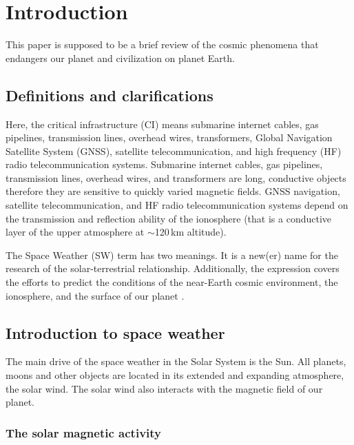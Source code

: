 \documentclass[sn-aps]{sn-jnl}%
\begin{document}
\section{Introduction}
\label{sec:intro}

This paper is supposed to be a brief review of the cosmic phenomena that endangers our planet and civilization on planet Earth. 

\subsection{Definitions and clarifications}
\label{sec:def}

Here, the critical infrastructure (CI) means submarine internet cables, gas pipelines, transmission lines, overhead wires, transformers, Global Navigation Satellite System (GNSS), satellite telecommunication, and high frequency (HF) radio telecommunication systems. Submarine internet cables, gas pipelines, transmission lines, overhead wires, and transformers are long, conductive objects therefore they are sensitive to quickly varied magnetic fields. GNSS navigation, satellite telecommunication, and HF radio telecommunication systems depend on the transmission and reflection ability of the ionosphere (that is a conductive layer of the upper atmosphere at $\sim$120\,km altitude).

The Space Weather (SW) term has two meanings. It is a new(er) name for the research of the solar-terrestrial relationship. Additionally, the expression covers the efforts to predict the conditions of the near-Earth cosmic environment, the ionosphere, and the surface of our planet \cite{scherer05:_space_weath}. 


\subsection{Introduction to space weather}
\label{sec:swintro}

The main drive of the space weather in the Solar System is the Sun. All planets, moons and other objects are located in its extended and expanding atmosphere, the solar wind. The solar wind also interacts with the magnetic field of our planet.

\subsubsection{The solar magnetic activity}
\label{sec:magnact}
\end{document}
